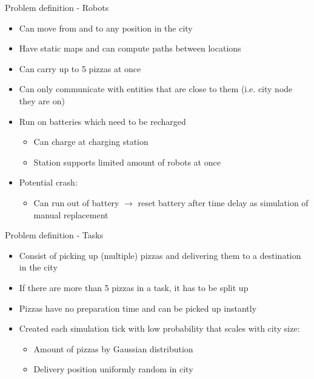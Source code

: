 \begin{frame}{Problem definition - Robots}
    \begin{itemize}
        \item Can move from and to any position in the city
        \item Have static maps and can compute paths between locations
        \item Can carry up to 5 pizzas at once
        \item Can only communicate with entities that are close to them (i.e. city node they are on)
        \item Run on batteries which need to be recharged
        \begin{itemize}
            \item Can charge at charging station
            \item Station supports limited amount of robots at once
        \end{itemize}

        \item Potential crash:
        \begin{itemize}
            \item Can run out of battery $\rightarrow$ reset battery after time delay as simulation of manual replacement
        \end{itemize}
    \end{itemize}
\end{frame}

\begin{frame}{Problem definition - Tasks}
    \begin{itemize}
        \item Consist of picking up (multiple) pizzas and delivering them to a destination in the city
        \item If there are more than 5 pizzas in a task, it has to be split up
        \item Pizzas have no preparation time and can be picked up instantly
        \item Created each simulation tick with low probability that scales with city size:
            \begin{itemize}
                \item Amount of pizzas by Gaussian distribution
                \item Delivery position uniformly random in city
            \end{itemize}
    \end{itemize}
\end{frame}
